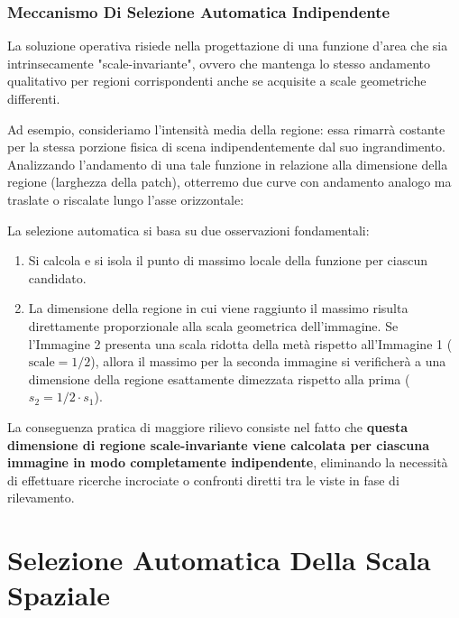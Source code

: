 ﻿\documentclass[11pt, a4paper]{article}
\begin{document}
\subsubsection{Meccanismo Di Selezione Automatica Indipendente}
La soluzione operativa risiede nella progettazione di una funzione d'area che sia intrinsecamente "scale-invariante", ovvero che mantenga lo stesso andamento qualitativo per regioni corrispondenti anche se acquisite a scale geometriche differenti.

Ad esempio, consideriamo l'intensità media della regione: essa rimarrà costante per la stessa porzione fisica di scena indipendentemente dal suo ingrandimento. Analizzando l'andamento di una tale funzione in relazione alla dimensione della regione (larghezza della patch), otterremo due curve con andamento analogo ma traslate o riscalate lungo l'asse orizzontale:


La selezione automatica si basa su due osservazioni fondamentali:
\begin{enumerate}
    \item Si calcola e si isola il punto di massimo locale della funzione per ciascun candidato.
    \item La dimensione della regione in cui viene raggiunto il massimo risulta direttamente proporzionale alla scala geometrica dell'immagine. Se l'Immagine 2 presenta una scala ridotta della metà rispetto all'Immagine 1 ($\text{scale} = 1/2$), allora il massimo per la seconda immagine si verificherà a una dimensione della regione esattamente dimezzata rispetto alla prima ($s_2 = 1/2 \cdot s_1$).
\end{enumerate}


La conseguenza pratica di maggiore rilievo consiste nel fatto che \textbf{questa dimensione di regione scale-invariante viene calcolata per ciascuna immagine in modo completamente indipendente}, eliminando la necessità di effettuare ricerche incrociate o confronti diretti tra le viste in fase di rilevamento.

\section{Selezione Automatica Della Scala Spaziale}
\end{document}

